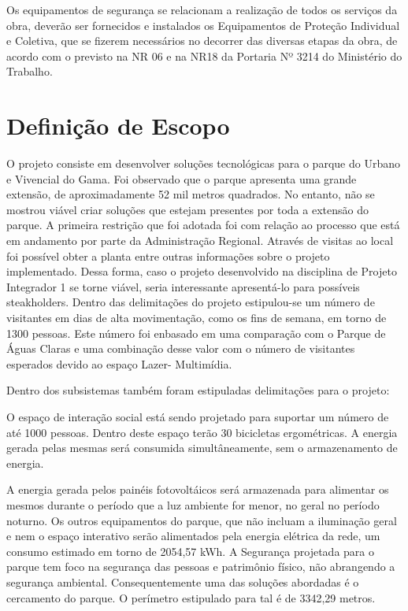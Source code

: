 	Os equipamentos de segurança se relacionam a realização de todos os serviços da obra, deverão ser fornecidos e instalados os Equipamentos de Proteção Individual e Coletiva, que se fizerem necessários no decorrer das diversas etapas da obra, de acordo com o previsto na NR 06 e na NR18 da Portaria Nº 3214 do Ministério do Trabalho.	
	
\section{Definição de Escopo}

	O projeto consiste em desenvolver soluções tecnológicas para o parque do Urbano e Vivencial do Gama. Foi observado que o parque apresenta uma grande extensão, de aproximadamente 52 mil metros quadrados. No entanto, não se mostrou viável criar soluções que estejam presentes por toda a extensão do parque. A primeira restrição que foi adotada foi com relação ao processo que está em andamento por parte da Administração Regional. Através de visitas ao local foi possível obter a planta entre outras informações sobre o projeto implementado. Dessa forma, caso o projeto desenvolvido na disciplina de Projeto Integrador 1 se torne viável, seria interessante apresentá-lo para possíveis steakholders. 
	Dentro das delimitações do projeto estipulou-se um número de visitantes em dias de alta movimentação, como os fins de semana, em torno de 1300 pessoas. Este número foi enbasado em uma comparação com o Parque de Águas Claras e uma combinação desse valor com o número de visitantes esperados devido ao espaço Lazer- Multimídia. 

	Dentro dos subsistemas também foram estipuladas delimitações para o projeto: 

	O espaço de interação social está sendo projetado para suportar um número de até 1000 pessoas. Dentro deste espaço terão 30 bicicletas ergométricas. A energia gerada pelas mesmas será consumida simultâneamente, sem o armazenamento de energia. 

	A energia gerada pelos painéis fotovoltáicos será armazenada para alimentar os mesmos durante o período que a luz ambiente for menor, no geral no período noturno. Os outros equipamentos do parque, que não incluam a iluminação geral e nem o espaço interativo serão alimentados pela energia elétrica da rede, um consumo estimado em torno de  2054,57 kWh. A Segurança projetada para o parque tem foco na segurança das pessoas e patrimônio físico, não abrangendo a segurança ambiental. Consequentemente uma das soluções abordadas é o cercamento do parque. O perímetro estipulado para tal é de 3342,29 metros. 


